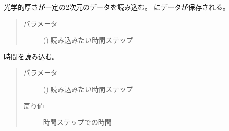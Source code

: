 \documentclass[letterpaper,10pt,dvipdfmx,report]{sphinxmanual}
\begin{document}

\begin{fulllineitems}
\label{\detokenize{io:R2D2.R2D2_data.read_qq_tau}}
光学的厚さが一定の2次元のデータを読み込む。{\hyperref[\detokenize{io:R2D2.R2D2_data.qt}]{}} にデータが保存される。
\begin{quote}\begin{description}
\item[{パラメータ}] \leavevmode
{} () \sphinxhyphen{}\sphinxhyphen{} 読み込みたい時間ステップ

\end{description}\end{quote}

\end{fulllineitems}


\begin{fulllineitems}
\label{\detokenize{io:R2D2.R2D2_data.read_time}}
時間を読み込む。
\begin{quote}\begin{description}
\item[{パラメータ}] \leavevmode
{} () \sphinxhyphen{}\sphinxhyphen{} 読み込みたい時間ステップ

\item[{戻り値}] \leavevmode
時間ステップでの時間

\end{description}\end{quote}

\end{fulllineitems}

\end{document}
